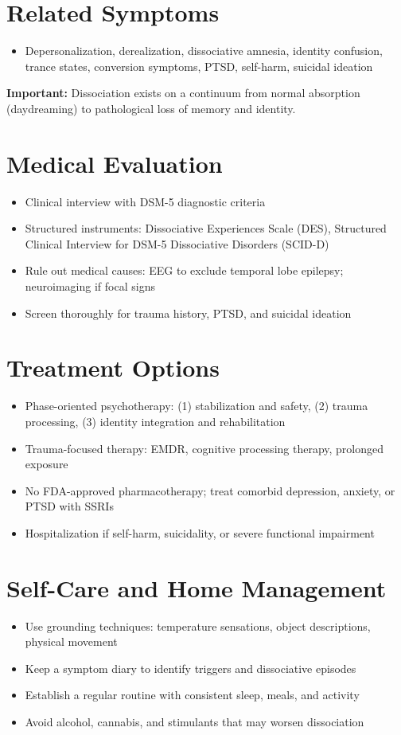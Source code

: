 \section*{Related Symptoms}
\begin{itemize}
  \item Depersonalization, derealization, dissociative amnesia, identity confusion, trance states, conversion symptoms, PTSD, self-harm, suicidal ideation
\end{itemize}
\textbf{Important:} Dissociation exists on a continuum from normal absorption (daydreaming) to pathological loss of memory and identity.

\section*{Medical Evaluation}
\begin{itemize}
  \item Clinical interview with DSM-5 diagnostic criteria
  \item Structured instruments: Dissociative Experiences Scale (DES), Structured Clinical Interview for DSM-5 Dissociative Disorders (SCID-D)
  \item Rule out medical causes: EEG to exclude temporal lobe epilepsy; neuroimaging if focal signs
  \item Screen thoroughly for trauma history, PTSD, and suicidal ideation
\end{itemize}

\section*{Treatment Options}
\begin{itemize}
  \item Phase-oriented psychotherapy: (1) stabilization and safety, (2) trauma processing, (3) identity integration and rehabilitation
  \item Trauma-focused therapy: EMDR, cognitive processing therapy, prolonged exposure
  \item No FDA-approved pharmacotherapy; treat comorbid depression, anxiety, or PTSD with SSRIs
  \item Hospitalization if self-harm, suicidality, or severe functional impairment
\end{itemize}

\section*{Self-Care and Home Management}
\begin{itemize}
  \item Use grounding techniques: temperature sensations, object descriptions, physical movement
  \item Keep a symptom diary to identify triggers and dissociative episodes
  \item Establish a regular routine with consistent sleep, meals, and activity
  \item Avoid alcohol, cannabis, and stimulants that may worsen dissociation
\end{itemize}

